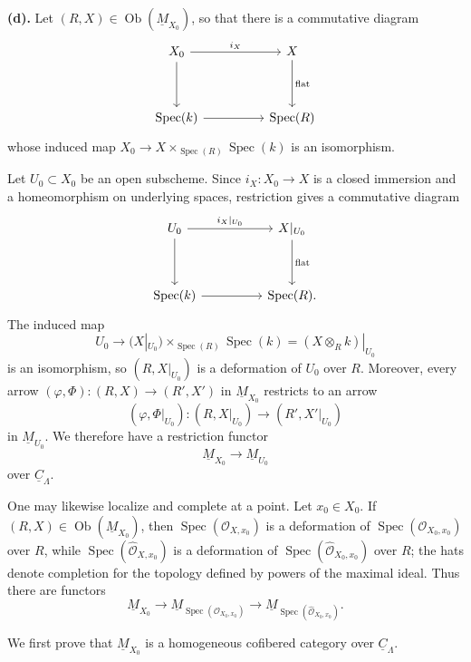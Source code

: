 \medskip
\noindent\textbf{(d).}
Let $(R,X)\in\operatorname{Ob}(\underline M_{X_0})$, so that there is
a commutative diagram
\[
\begin{tikzcd}[column sep=huge,row sep=huge]
X_0 \arrow[r,"i_X"] \arrow[d] & X \arrow[d,"\mathrm{flat}"] \\
\operatorname{Spec}(k) \arrow[r] & \operatorname{Spec}(R)
\end{tikzcd}
\]
whose induced map
$X_0\longrightarrow X\times_{\operatorname{Spec}(R)}
\operatorname{Spec}(k)$ is an isomorphism.


Let $U_0\subset X_0$ be an open subscheme. Since
$i_X:X_0\longrightarrow X$ is a closed immersion and a homeomorphism
on underlying spaces, restriction gives a commutative diagram
\[
\begin{tikzcd}[column sep=huge,row sep=huge]
U_0 \arrow[r,"i_X|_{U_0}"] \arrow[d]
& X|_{U_0} \arrow[d,"\mathrm{flat}"] \\
\operatorname{Spec}(k) \arrow[r] & \operatorname{Spec}(R).
\end{tikzcd}
\]
The induced map
\[
 U_0\longrightarrow
 (X|_{U_0})\times_{\operatorname{Spec}(R)}\operatorname{Spec}(k)
 =(X\otimes_Rk)|_{U_0}
\]
is an isomorphism, so $(R,X|_{U_0})$ is a deformation of $U_0$ over
$R$. Moreover, every arrow
$(\varphi,\Phi):(R,X)\longrightarrow(R',X')$ in
$\underline M_{X_0}$ restricts to an arrow
\[
 (\varphi,\Phi|_{U_0}):(R,X|_{U_0})
 \longrightarrow(R',X'|_{U_0})
\]
in $\underline M_{U_0}$. We therefore have a restriction functor
\[
 \underline M_{X_0}\longrightarrow\underline M_{U_0}
\]
over $\underline C_\Lambda$.

One may likewise localize and complete at a point. Let
$x_0\in X_0$. If $(R,X)\in\operatorname{Ob}(\underline M_{X_0})$,
then $\operatorname{Spec}(\mathcal O_{X,x_0})$ is a deformation of
$\operatorname{Spec}(\mathcal O_{X_0,x_0})$ over $R$, while
$\operatorname{Spec}(\widehat{\mathcal O}_{X,x_0})$ is a deformation
of $\operatorname{Spec}(\widehat{\mathcal O}_{X_0,x_0})$ over $R$;
the hats denote completion for the topology defined by powers of the
maximal ideal. Thus there are functors
\[
 \underline M_{X_0}
 \longrightarrow
 \underline M_{\operatorname{Spec}(\mathcal O_{X_0,x_0})}
 \longrightarrow
 \underline M_{\operatorname{Spec}(\widehat{\mathcal O}_{X_0,x_0})}.
\]

We first prove that $\underline M_{X_0}$ is a homogeneous cofibered
category over $\underline C_\Lambda$.
